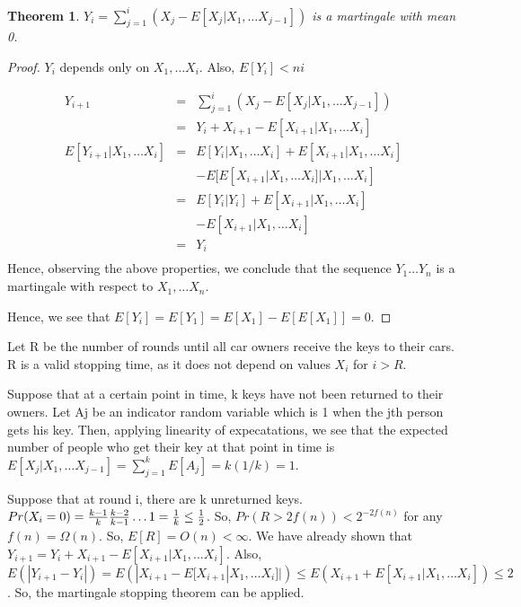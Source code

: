 \documentclass[10pt]{amsart}
\newtheorem{thm}{Theorem}[subsection]
\theoremstyle{remark}
\begin{document}
\begin{thm}
$Y_{i}=\sum_{j=1}^{i}(X_{j}-E[X_{j}|X_{1},\dots X_{j-1}])$ is a martingale with mean 0.
\end{thm}
\begin{proof}
$Y_{i}$ depends only on $X_{1},\dots X_{i}$. Also, $E[Y_{i}] < ni$

\begin{eqnarray*}
Y_{i+1} &=& \sum_{j=1}^{i}(X_{j}-E[X_{j}|X_{1},\dots X_{j-1}])\\
&=& Y_{i} + X_{i+1}-E[X_{i+1}|X_{1},\dots X_{i}]\\
E[Y_{i+1}|X_{1},\dots X_{i}] &=& E[Y_{i}|X_{1},\dots X_{i}] + E[X_{i+1}|X_{1},\dots X_{i}]\\
&& -E[E[X_{i+1}|X_{1},\dots X_{i}]|X_{1},\dots X_{i}]\\
&=& E[Y_{i}|Y_{i}] + E[X_{i+1}|X_{1},\dots X_{i}]\\
&& -E[X_{i+1}|X_{1},\dots X_{i}]\\
&=& Y_{i}\\
\end{eqnarray*}
Hence, observing the above properties, we conclude that the sequence $Y_{1} \dots Y_{n}$ is a martingale with respect to $X_{1}, \dots X_{n}$.

Hence, we see that $E[Y_{i}] = E[Y_{1}] = E[X_{1}]-E[E[X_{1}]] = 0$.
\end{proof}

Let R be the number of rounds until all car owners receive the keys to their cars. R is a valid stopping time, as it does not depend on values $X_{i}$ for $i>R$.

Suppose that at a certain point in time, k keys have not been returned to their owners. Let Aj be an indicator random variable which is 1 when the jth person gets his key. Then, applying linearity of expecatations, we see that the expected number of people who get their key at that point in time is $E[X_{j}|X_{1},\dots X_{j-1}] = \sum_{j=1}^{k} E[A_{j}] = k(1/k) = 1$.

Suppose that at round i, there are k unreturned keys. $Pr(X_{i}=0)=\frac{k-1}{k}\frac{k-2}{k-1}\dots1 \\
= \frac{1}{k} \leq \frac{1}{2}$. So, $Pr(R > 2f(n)) < 2^{-2f(n)}$ for any $f(n) = \Omega(n)$. So, $E[R] = O(n) < \infty$. We have already shown that $Y_{i+1} = Y_{i} + X_{i+1}-E[X_{i+1}|X_{1},\dots X_{i}]$. Also, $E(|Y_{i+1}-Y_{i}|) = E(|X_{i+1}-E[X_{i+1}|X_{1},\dots X_{i}]|) \leq E(X_{i+1}+E[X_{i+1}|X_{1},\dots X_{i}]) \leq 2$. So, the martingale stopping theorem can be applied.
\end{document}
